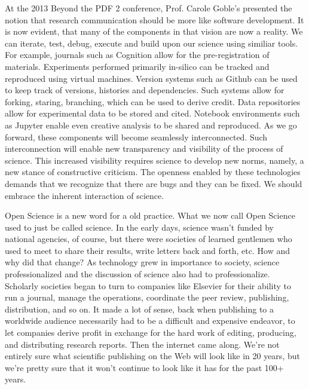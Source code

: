 \documentclass[a4paper,UKenglish]{dagrep}
\begin{document}
{}
\license
At the 2013 Beyond the PDF 2 conference, Prof. Carole Goble's presented the
notion that research communication should be more like software development. It
is now evident, that many of the components in that vision are now a reality. We
can iterate, test, debug, execute and build upon our science using similiar
tools. For example, journals such as Cognition allow for the pre-registration of
materials. Experiments performed primarily in-silico can be tracked and
reproduced using virtual machines. Version systems such as Github can be used to
keep track of versions, histories and dependencies. Such systems allow for
forking, staring, branching, which can be used to derive credit. Data
repositories allow for experimental data to be stored and cited. Notebook
environments such as Jupyter enable even creative analysis to be shared and
reproduced. As we go forward, these components will become seamlessly
interconnected. Such interconnection will enable new transparency and visibility
of the process of science. This increased visibility requires science to develop
new norms, namely, a new stance of constructive criticism. The openness enabled
by these technologies demands that we recognize that there are bugs and they can
be fixed. We should embrace the inherent interaction of science. 


{}
\license
Open Science is a new word for a old practice. What we now call Open Science
used to just be called science. In the early days, science wasn't funded by
national agencies, of course, but there were societies of learned gentlemen who
used to meet to share their results, write letters back and forth, etc. How and
why did that change? As technology grew in importance to society, science
professionalized and the discussion of science also had to professionalize.
Scholarly societies began to turn to companies like Elsevier for their ability
to run a journal, manage the operations, coordinate the peer review, publishing,
distribution, and so on. It made a lot of sense, back when publishing to a
worldwide audience necessarily had to be a difficult and expensive endeavor, to
let companies derive profit in exchange for the hard work of editing, producing,
and distributing research reports. Then the internet came along. We're not
entirely sure what scientific publishing on the Web will look like in 20 years,
but we're pretty sure that it won't continue to look like it has for the past
100+ years.
\end{document}
